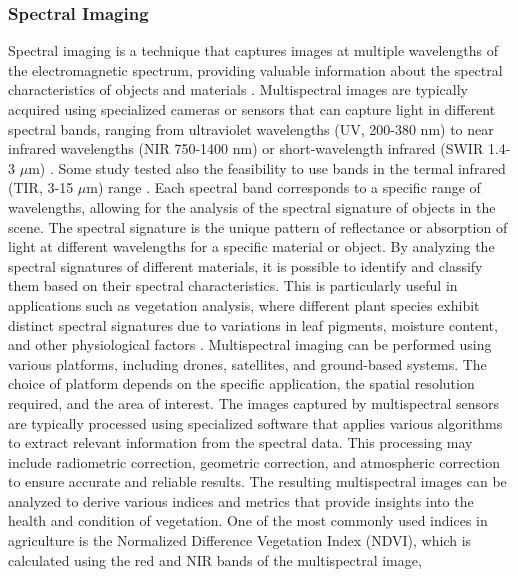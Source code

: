 \documentclass[12pt,a4paper,oneside]{report}
\begin{document}
\subsubsection{Spectral Imaging}
Spectral imaging is a technique that captures images at multiple wavelengths
of the electromagnetic spectrum, providing valuable information about the spectral
characteristics of objects and materials
\cite{meerImagingSpectrometryBasic2001,thenkabailHyperspectralRemoteSensing2016}. 
Multispectral images are typically acquired using specialized
cameras or sensors that can capture light in different spectral bands, ranging
from ultraviolet wavelengths (UV, 200-380 nm) to near infrared wavelengths (NIR 750-1400 nm) or short-wavelength infrared (SWIR 1.4-3 \ensuremath{\mu\text{m}}) 
\cite{thenkabailHyperspectralRemoteSensing2016,mahleinHyperspectralSensorsImaging2018}. 
Some study tested also the 
feasibility to use bands in the termal infrared (TIR, 3-15 \ensuremath{\mu\text{m}}) range \cite{wanOptimizingUAVbasedUncooled2024}.
Each spectral band corresponds
to a specific range of wavelengths, allowing for the analysis of the spectral
signature of objects in the scene.
The spectral signature is the unique pattern of reflectance or absorption of
light at different wavelengths for a specific material or object. By analyzing
the spectral signatures of different materials, it is possible to identify and
classify them based on their spectral characteristics. This is particularly useful
in applications such as vegetation analysis, where different plant species exhibit
distinct spectral signatures due to variations in leaf pigments, moisture content,
and other physiological factors
\cite{sarviaGeometricVsSpectral2024}.
Multispectral imaging can be performed using various platforms, including
drones, satellites, and ground-based systems. The choice of platform depends on
the specific application, the spatial resolution required, and the area of interest.
The images captured by multispectral sensors are typically processed using
specialized software that applies various algorithms to extract relevant information
from the spectral data. This processing may include radiometric correction,
geometric correction, and atmospheric correction to ensure accurate and reliable
results.
The resulting multispectral images can be analyzed to derive various indices
and metrics that provide insights into the health and condition of vegetation.
One of the most commonly used indices in agriculture is the Normalized Difference
Vegetation Index (NDVI), which is calculated using the red and NIR
bands of the multispectral image,
\end{document}
